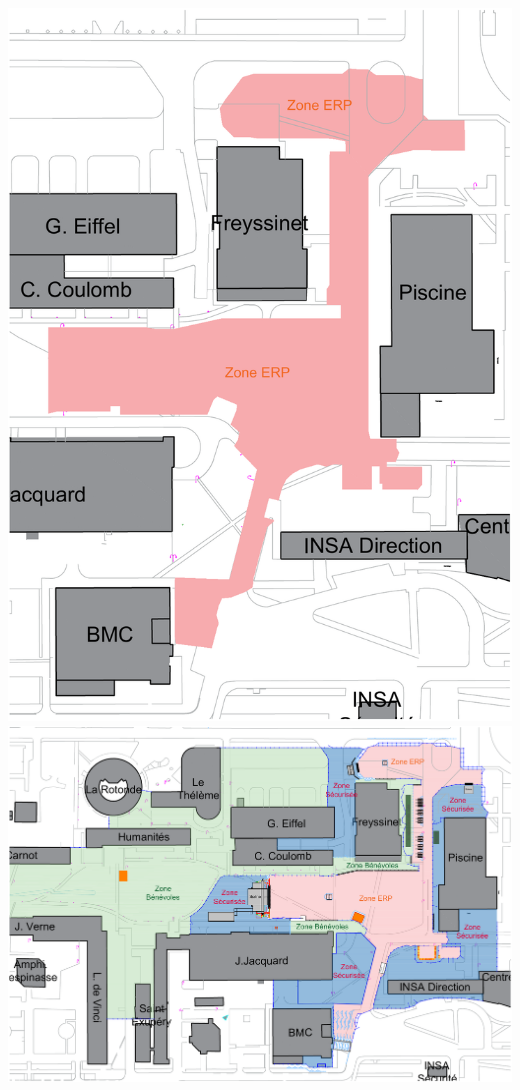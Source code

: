 \documentclass[hidelinks, paper=a4, fontsize=13pt]{report}
\begin{document}
\begin{center}
	\includegraphics[width=.8\textwidth,keepaspectratio]{Exports/Plan_24h_44eme-Plan_de_situation}
	\vspace{5mm}
	\includegraphics[angle=90,scale=0.7]{Exports/Plan_24h_44eme-Plan_ERP}
\end{center}
\end{document}
